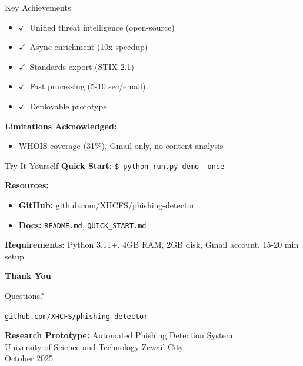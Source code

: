 \documentclass[aspectratio=169]{beamer}
\newcommand{\cmark}{\textcolor{lowgreen}{$\checkmark$}}
\begin{document}
\begin{frame}{Key Achievements}
\small
\begin{itemize}
    \item \cmark\ Unified threat intelligence (open-source)
    \item \cmark\ Async enrichment (10x speedup)
    \item \cmark\ Standards export (STIX 2.1)
    \item \cmark\ Fast processing (5-10 sec/email)
    \item \cmark\ Deployable prototype
\end{itemize}

\vspace{0.3cm}
\textbf{Limitations Acknowledged:}
\begin{itemize}
    \item WHOIS coverage (31\%), Gmail-only, no content analysis
\end{itemize}
\end{frame}

\begin{frame}{Try It Yourself}
\vspace*{-0.4cm}
\small
\textbf{Quick Start:} \texttt{\$ python run.py demo --once}

\vspace{0.1cm}
\scriptsize
\textbf{Resources:}
\begin{itemize}
    \scriptsize
    \item \textbf{GitHub:} github.com/XHCFS/phishing-detector
    \item \textbf{Docs:} \texttt{README.md}, \texttt{QUICK\_START.md}
\end{itemize}

\vspace{0.1cm}
\scriptsize
\textbf{Requirements:} Python 3.11+, 4GB RAM, 2GB disk, Gmail account, 15-20 min setup
\end{frame}

\begin{frame}[plain]
\begin{center}
\Huge{\textbf{Thank You}}

\vspace{1cm}
\Large{Questions?}

\vspace{1.5cm}
\large{\texttt{github.com/XHCFS/phishing-detector}}

\vspace{1cm}
\normalsize{\textbf{Research Prototype:} Automated Phishing Detection System}\\
\small{University of Science and Technology Zewail City}\\
\small{October 2025}
\end{center}
\end{frame}
\end{document}
